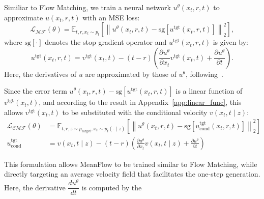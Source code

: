 Similiar to Flow Matching, we train a neural network $u^\theta(x_t, r, t)$ to approximate $u(x_t, r, t)$ with an MSE loss:
\begin{equation}
  \mathcal{L_\text{MF}} (\theta) = \mathbb{E}_{t, r, x_t \sim p_t} \left[ \left\| u^\theta(x_t, r, t) - \text{sg} \left[u^\text{tgt} (x_t, r, t)\right] \right\|_2^2 \right],
\end{equation}
%
where $\text{sg}\left[ \cdot \right]$ denotes the stop gradient operator and $u^\text{tgt}(x_t, r, t)$ is given by:
\begin{equation}
  u^\text{tgt} (x_t, r, t) =  v^\text{tgt}(x_t, t) - (t - r) \left( \frac{\partial u^\theta}{\partial x_t} v^\text{tgt}(x_t, t) + \frac{\partial u^\theta}{\partial t}\right).
\end{equation}
%
Here, the derivatives of $u$ are approximated by those of $u^\theta$, following~\cite{meanflow}.

Since the error term $u^\theta(x_t, r, t) - \text{sg} \left[u^\text{tgt} (x_t, r, t) \right]$ is a linear function of $v^\text{tgt}(x_t, t)$, and according to the result in Appendix~\ref{app:linear_func}, this allows $v^\text{tgt}(x_t, t)$ to be substituted with the conditional velocity $v(x_t, t \mid z)$:
%
\begin{align}
   \mathcal{L_\text{CMF}} (\theta) &= \mathbb{E}_{t, r, z \sim p_\text{target}, x_t \sim p_t(\cdot \mid z)} \left[ \left\| u^\theta(x_t, r, t) - \text{sg} \left[u^\text{tgt}_\text{cond} (x_t, r, t) \right] \right\|_2^2 \right] \\
   u^\text{tgt}_\text{cond} &=  v(x_t, t \mid z) - (t - r) \left( \frac{\partial u^\theta}{\partial x_t} v(x_t, t \mid z) + \frac{\partial u^\theta}{\partial t} \right)
\end{align}

This formulation allows MeanFlow to be trained similar to Flow Matching, while directly targeting an average velocity field that facilitates the one-step generation. Here, the derivative $\dfrac{d u^\theta}{d t}$ is computed by the
